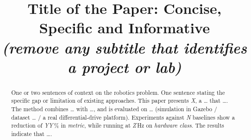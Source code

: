 \documentclass[conference]{IEEEtran}
\begin{document}
\title{Title of the Paper: Concise, Specific and Informative\\
{\footnotesize \textit{(remove any subtitle that identifies a project or lab)}}}

\author{
}


\maketitle

\begin{abstract}
One or two sentences of context on the robotics problem.
One sentence stating the specific gap or limitation of existing approaches.
This paper presents \emph{X}, a \ldots{} that \ldots.
The method combines \ldots{} with \ldots, and is evaluated on \ldots{}
(simulation in Gazebo / dataset \ldots{} / a real differential-drive platform).
Experiments against \emph{N} baselines show a reduction of \emph{YY}\,\% in
\emph{metric}, while running at \emph{Z}\,Hz on \emph{hardware class}.
The results indicate that \ldots.
\end{abstract}
\end{document}
